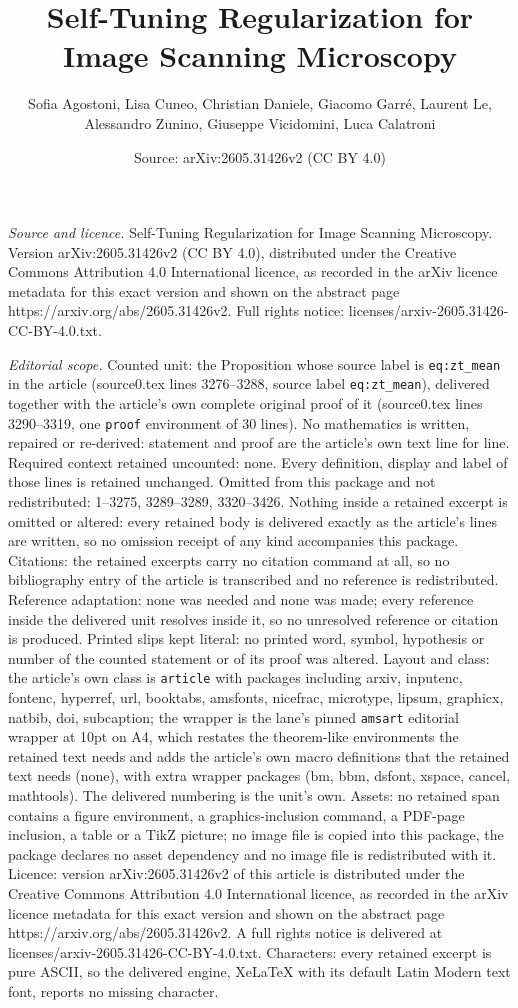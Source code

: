 \documentclass[10pt,a4paper]{amsart}
\title[Self-Tuning Regularization for Image Scanning Microscopy]{Self-Tuning Regularization for Image Scanning Microscopy}
\author{Sofia Agostoni, Lisa Cuneo, Christian Daniele, Giacomo Garr\'e, Laurent Le, Alessandro Zunino, Giuseppe Vicidomini, Luca Calatroni}
\date{Source: arXiv:2605.31426v2 (CC BY 4.0)}
\begin{document}
\maketitle

\noindent\emph{Source and licence.} Self-Tuning Regularization for Image Scanning Microscopy. Version arXiv:2605.31426v2 (CC BY 4.0), distributed under the Creative Commons Attribution 4.0 International licence, as recorded in the arXiv licence metadata for this exact version and shown on the abstract page https://arxiv.org/abs/2605.31426v2. Full rights notice: licenses/arxiv-2605.31426-CC-BY-4.0.txt.\par\smallskip

\noindent\textit{Editorial scope.} Counted unit: the Proposition whose source label is \texttt{eq:zt\_mean} in the article (source0.tex lines 3276--3288, source label \texttt{eq:zt\_mean}), delivered together with the article's own complete original proof of it (source0.tex lines 3290--3319, one \texttt{proof} environment of 30 lines). No mathematics is written, repaired or re-derived: statement and proof are the article's own text line for line. Required context retained uncounted: none. Every definition, display and label of those lines is retained unchanged. Omitted from this package and not redistributed: 1--3275, 3289--3289, 3320--3426. Nothing inside a retained excerpt is omitted or altered: every retained body is delivered exactly as the article's lines are written, so no omission receipt of any kind accompanies this package. Citations: the retained excerpts carry no citation command at all, so no bibliography entry of the article is transcribed and no reference is redistributed. Reference adaptation: none was needed and none was made; every reference inside the delivered unit resolves inside it, so no unresolved reference or citation is produced. Printed slips kept literal: no printed word, symbol, hypothesis or number of the counted statement or of its proof was altered. Layout and class: the article's own class is \texttt{article} with packages including arxiv, inputenc, fontenc, hyperref, url, booktabs, amsfonts, nicefrac, microtype, lipsum, graphicx, natbib, doi, subcaption; the wrapper is the lane's pinned \texttt{amsart} editorial wrapper at 10pt on A4, which restates the theorem-like environments the retained text needs and adds the article's own macro definitions that the retained text needs (none), with extra wrapper packages (bm, bbm, dsfont, xspace, cancel, mathtools). The delivered numbering is the unit's own. Assets: no retained span contains a figure environment, a graphics-inclusion command, a PDF-page inclusion, a table or a TikZ picture; no image file is copied into this package, the package declares no asset dependency and no image file is redistributed with it. Licence: version arXiv:2605.31426v2 of this article is distributed under the Creative Commons Attribution 4.0 International licence, as recorded in the arXiv licence metadata for this exact version and shown on the abstract page https://arxiv.org/abs/2605.31426v2. A full rights notice is delivered at licenses/arxiv-2605.31426-CC-BY-4.0.txt. Characters: every retained excerpt is pure ASCII, so the delivered engine, XeLaTeX with its default Latin Modern text font, reports no missing character.
\end{document}
